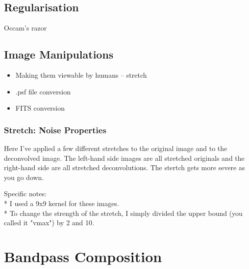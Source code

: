 \documentclass[letterpaper, 11pt]{article}
\begin{document}
\subsection{Regularisation}
\label{sec:regularisation}


Occam's razor



\subsection{Image Manipulations}

\begin{itemize}
	\item Making them viewable by humans -- stretch
	\item .psf file conversion
	\item FITS conversion
\end{itemize}


\subsubsection{Stretch: Noise Properties}

Here I've applied a few different stretches to the original image and to the deconvolved image. The left-hand side images are all stretched originals and the right-hand side are all stretched deconvolutions. The stertch gets more severe as you go down.


Specific notes:\\
* I used a 9x9 kernel for these images.\\
* To change the strength of the stretch, I simply divided the upper bound (you called it "vmax") by 2 and 10.\\




\newpage
\section{Bandpass Composition}
\label{sec:colour}
\end{document}
